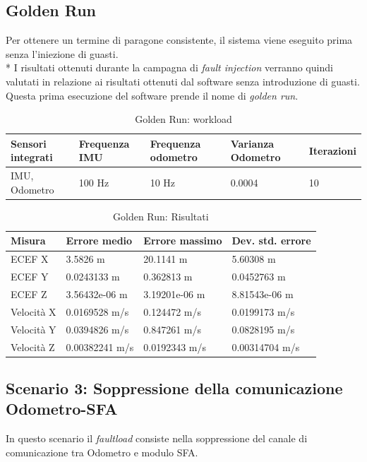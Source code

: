 \subsection{Golden Run}
Per ottenere un termine di paragone consistente, il sistema viene eseguito prima senza l'iniezione di guasti.\\*
I risultati ottenuti durante la campagna di \emph{fault injection} verranno quindi valutati in relazione ai risultati ottenuti dal software senza introduzione di guasti. Questa prima esecuzione del software prende il nome di \emph{golden run}.
\begin{table}[h]
	\centering
	\begin{tabular}{|p{3.25cm}|p{2cm}|p{2cm}|p{2cm}|p{2cm}|}
		\hline 
		\textbf{Sensori integrati} & \textbf{Frequenza IMU}  & \textbf{Frequenza odometro} & \textbf{Varianza Odometro} & \textbf{Iterazioni} \\ 
		\hline 
		IMU, Odometro & 100 Hz & 10 Hz & 0.0004 & 10 \\
		\hline 
	\end{tabular}
	\caption{Golden Run: workload}
	\label{tab:exp12}
\end{table}
\begin{table}[h]
	\centering
	\begin{tabular}{|p{2cm}|p{3cm}|p{3cm}|p{3cm}|}
		\hline 
		\textbf{Misura} & \textbf{Errore medio}  & \textbf{Errore massimo} & \textbf{Dev. std. errore}\\ 
		\hline 
		ECEF X & 3.5826 m & 20.1141 m & 5.60308 m \\ 
		\hline 
		ECEF Y & 0.0243133 m & 0.362813 m & 0.0452763 m \\ 
		\hline 
		ECEF Z & 3.56432e-06 m & 3.19201e-06 m & 8.81543e-06 m \\ 
		\hline 
		Velocit\`a X & 0.0169528 m/s & 0.124472 m/s & 0.0199173 m/s \\ 
		\hline 
		Velocit\`a Y & 0.0394826 m/s & 0.847261 m/s & 0.0828195 m/s \\ 
		\hline 
		Velocit\`a Z & 0.00382241 m/s & 0.0192343 m/s & 0.00314704 m/s \\ 
		\hline 
	\end{tabular}
	\caption{Golden Run: Risultati}
	\label{tab:exp12res}
\end{table}
\FloatBarrier
\subsection{Scenario 3: Soppressione della comunicazione Odometro-SFA}
In questo scenario il \emph{faultload} consiste nella soppressione del canale di comunicazione tra Odometro e modulo SFA.
